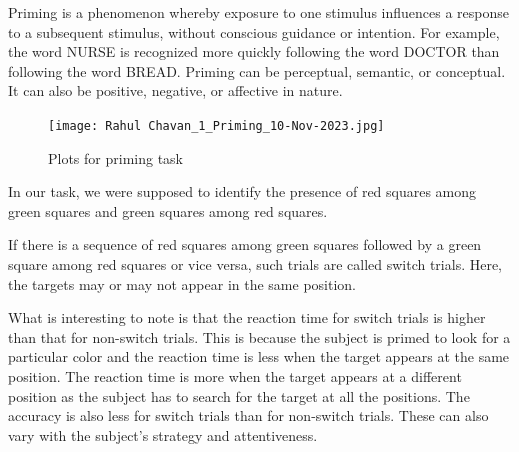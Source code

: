 \documentclass{report}
\begin{document}
Priming is a phenomenon whereby exposure to one stimulus influences 
a response to a subsequent stimulus, without conscious guidance or 
intention. For example, the word NURSE is recognized more quickly 
following the word DOCTOR than following the word BREAD. Priming 
can be perceptual, semantic, or conceptual. It can also be positive, 
negative, or affective in nature.


\begin{figure}[htbp]  
  \centering 
  \texttt{[image: Rahul Chavan\_1\_Priming\_10-Nov-2023.jpg]} 
  \caption{Plots for priming task}
  \label{fig: priming} 
\end{figure}

In our task, we were supposed to identify the presence of red 
squares among green squares and green squares among red squares.

If there is a sequence of red squares among green squares 
followed by a green square among red squares or vice versa, 
such trials are called switch trials.  Here, the targets may or 
may not appear in the same position.

What is interesting to note is that the reaction time for switch trials 
is higher than that for non-switch trials. This is because the subject 
is primed to look for a particular color and the reaction time is less 
when the target appears at the same position. The reaction time is more 
when the target appears at a different position as the subject has to 
search for the target at all the positions. The accuracy is also less 
for switch trials than for non-switch trials. These can also vary with 
the subject's strategy and attentiveness.
\end{document}
